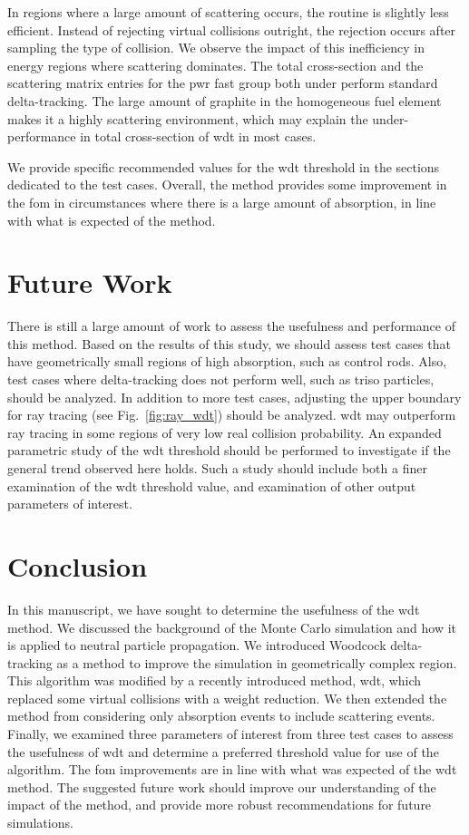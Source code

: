 In regions where a large amount of scattering occurs, the routine is
slightly less efficient. Instead of rejecting virtual collisions
outright, the rejection occurs after sampling the type of
collision. We observe the impact of this inefficiency in energy
regions where scattering dominates. The total cross-section and the
scattering matrix entries for the \gls{pwr} fast group both under
perform standard delta-tracking. The large amount of graphite in the
homogeneous fuel element makes it a highly scattering environment,
which may explain the under-performance in total cross-section of
\gls{wdt} in most cases.

We provide specific recommended values for the \gls{wdt} threshold in
the sections dedicated to the test cases. Overall, the method provides
some improvement in the \gls{fom} in circumstances where there is a
large amount of absorption, in line with what is expected of the method.

\section{Future Work}
\label{sec:future_work}

There is still a large amount of work to assess the usefulness and
performance of this method. Based on the results of this study, we
should assess test cases that have geometrically small regions of high
absorption, such as control rods. Also, test cases where
delta-tracking does not perform well, such as \gls{triso} particles,
should be analyzed. In addition to more test cases, adjusting the
upper boundary for ray tracing (see Fig.~\ref{fig:ray_wdt}) should be
analyzed. \Gls{wdt} may outperform ray tracing in some regions of very
low real collision probability. An expanded parametric study of
the \gls{wdt} threshold should be performed to investigate if the general
trend observed here holds. Such a study should include both a finer
examination of the \gls{wdt} threshold value, and examination of other
output parameters of interest.

\section{Conclusion}
\label{sec:conclusion}

In this manuscript, we have sought to determine the usefulness of the
\gls{wdt} method. We discussed the background of the Monte Carlo
simulation and how it is applied to neutral particle propagation. We
introduced Woodcock delta-tracking as a method to improve the
simulation in geometrically complex region. This algorithm was
modified by a recently introduced method, \acrlong{wdt}, which
replaced some virtual collisions with a weight reduction. We then
extended the method from considering only absorption events to include
scattering events. Finally, we examined three parameters of interest
from three test cases to assess the usefulness of \gls{wdt} and
determine a preferred threshold value for use of the algorithm. The
\gls{fom} improvements are in line with what was expected of the
\gls{wdt} method. The suggested future work should improve our
understanding of the impact of the method, and provide more robust
recommendations for future simulations.



